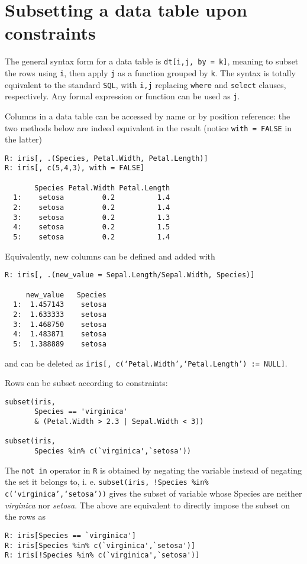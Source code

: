 \section{Subsetting a data table upon constraints}
The general syntax form for a data table is 
\texttt{dt[i,j, by = k]}, meaning to subset the rows using 
\texttt{i}, then apply \texttt{j} as a function grouped by
\texttt{k}. The syntax is totally equivalent to the 
standard \texttt{SQL}, with \texttt{i,j} replacing 
\texttt{where} and \texttt{select} clauses, respectively.
Any formal expression or function can be used 
as \texttt{j}.
\bigskip 

Columns in a data table can be accessed by name 
or by position reference: the two methods below are
indeed equivalent in the result (notice 
\texttt{with = FALSE} in the latter)
\begin{verbatim}
R: iris[, .(Species, Petal.Width, Petal.Length)]
R: iris[, c(5,4,3), with = FALSE]

       Species Petal.Width Petal.Length
  1:    setosa         0.2          1.4
  2:    setosa         0.2          1.4
  3:    setosa         0.2          1.3
  4:    setosa         0.2          1.5
  5:    setosa         0.2          1.4 
\end{verbatim}
\bigskip 

Equivalently, new columns can be defined and added
with
\begin{verbatim}
R: iris[, .(new_value = Sepal.Length/Sepal.Width, Species)]

     new_value   Species
  1:  1.457143    setosa
  2:  1.633333    setosa
  3:  1.468750    setosa
  4:  1.483871    setosa
  5:  1.388889    setosa
\end{verbatim}
and can be deleted as
\texttt{iris[, c(`Petal.Width',`Petal.Length') := NULL]}.
\bigskip

Rows can be subset according to constraints:
\begin{verbatim}
subset(iris, 
       Species == 'virginica'
       & (Petal.Width > 2.3 | Sepal.Width < 3)) 
       
subset(iris,
       Species %in% c(`virginica',`setosa'))
\end{verbatim}
The \texttt{not in} operator in \texttt{R} is obtained
by negating the variable instead of negating 
the set it belongs to, i. e. 
\texttt{subset(iris,
      !Species \%in\% c(`virginica',`setosa'))}
gives the subset of variable whose Species are neither 
\emph{virginica} nor \emph{setosa}. The above are 
equivalent to directly impose the subset 
on the rows as
\begin{verbatim}
R: iris[Species == `virginica']
R: iris[Species %in% c(`virginica',`setosa')]
R: iris[!Species %in% c(`virginica',`setosa')]
\end{verbatim}
\bigskip 

